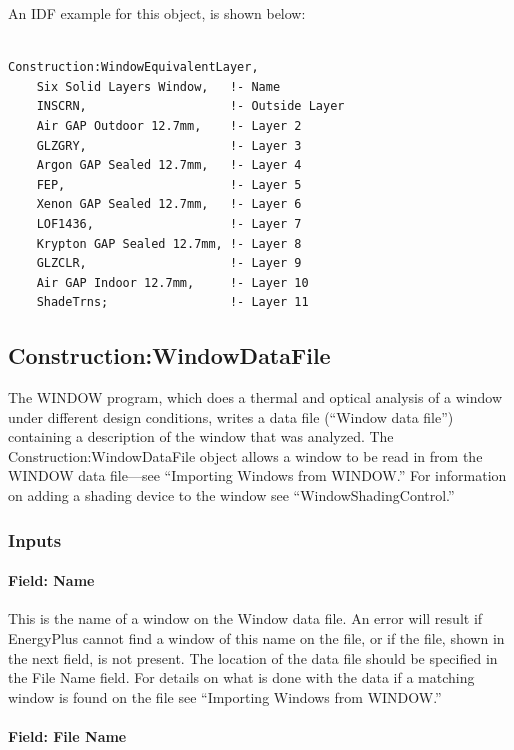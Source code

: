 An IDF example for this object, is shown below:

\begin{lstlisting}

Construction:WindowEquivalentLayer,
    Six Solid Layers Window,   !- Name
    INSCRN,                    !- Outside Layer
    Air GAP Outdoor 12.7mm,    !- Layer 2
    GLZGRY,                    !- Layer 3
    Argon GAP Sealed 12.7mm,   !- Layer 4
    FEP,                       !- Layer 5
    Xenon GAP Sealed 12.7mm,   !- Layer 6
    LOF1436,                   !- Layer 7
    Krypton GAP Sealed 12.7mm, !- Layer 8
    GLZCLR,                    !- Layer 9
    Air GAP Indoor 12.7mm,     !- Layer 10
    ShadeTrns;                 !- Layer 11
\end{lstlisting}

\subsection{Construction:WindowDataFile}\label{constructionwindowdatafile}

The WINDOW program, which does a thermal and optical analysis of a window under different design conditions, writes a data file (``Window data file'') containing a description of the window that was analyzed. The Construction:WindowDataFile object allows a window to be read in from the WINDOW data file---see ``Importing Windows from WINDOW.'' For information on adding a shading device to the window see ``WindowShadingControl.''

\subsubsection{Inputs}\label{inputs-42}

\paragraph{Field: Name}\label{field-name-36}

This is the name of a window on the Window data file. An error will result if EnergyPlus cannot find a window of this name on the file, or if the file, shown in the next field, is not present. The location of the data file should be specified in the File Name field. For details on what is done with the data if a matching window is found on the file see ``Importing Windows from WINDOW.''

\paragraph{Field: File Name}\label{field-file-name-000}

